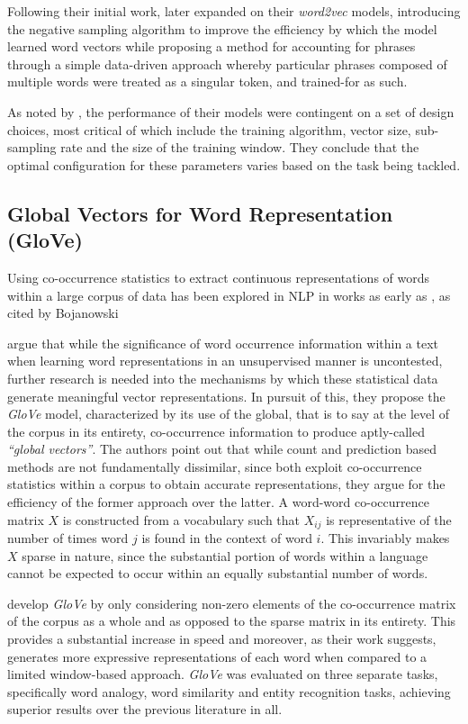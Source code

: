 \documentclass[../../fyp.tex]{subfiles}
\begin{document}
Following their initial work, \citet{mikolov2013b} later expanded on their \textit{word2vec} models, introducing the negative sampling algorithm to improve the efficiency by which the model learned word vectors while proposing a method for accounting for phrases through a simple data-driven approach whereby particular phrases composed of multiple words were treated as a singular token, and trained-for as such.

As noted by \citet{mikolov2013}, the performance of their models were contingent on a set of design choices, most critical of which include the training algorithm, vector size, sub-sampling rate and the size of the training window. They conclude that the optimal configuration for these parameters varies based on the task being tackled.

\subsection{Global Vectors for Word Representation (GloVe)}
Using co-occurrence statistics to extract continuous representations of words within a large corpus of data has been explored in NLP in works as early as \citet{rumelhart1988}, as cited by Bojanowski \cite{bojanowski2017}

\citet{pennington} argue that while the significance of word occurrence information within a text when learning word representations in an unsupervised manner is uncontested, further research is needed into the mechanisms by which these statistical data generate meaningful vector representations. In pursuit of this, they propose the \textit{GloVe} model, characterized by its use of the global, that is to say at the level of the corpus in its entirety, co-occurrence information to produce aptly-called \textit{\enquote{global vectors}}. The authors point out that while count and prediction based methods are not fundamentally dissimilar, since both exploit co-occurrence statistics within a corpus to obtain accurate representations, they argue for the efficiency of the former approach over the latter. A word-word co-occurrence matrix $X$ is constructed from a vocabulary such that $X_{ij}$ is representative of the number of times word $j$ is found in the context of word $i$. This invariably makes $X$ sparse in nature, since the substantial portion of words within a language cannot be expected to occur within an equally substantial number of words.

\citet{pennington} develop \textit{GloVe} by only considering non-zero elements of the co-occurrence matrix of the corpus as a whole and as opposed to the sparse matrix in its entirety. This provides a substantial increase in speed and moreover, as their work suggests, generates more expressive representations of each word when compared to a limited window-based approach. \textit{GloVe} was evaluated on three separate tasks, specifically word analogy, word similarity and entity recognition tasks, achieving superior results over the previous literature in all.
\end{document}

